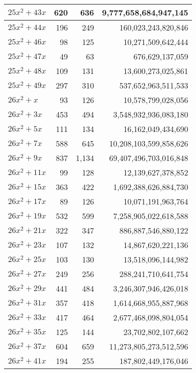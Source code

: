 \documentclass[a4paper]{amsproc}
\theoremstyle{plain}
\begin{document}
\begin{longtable}{ | l | r | r | r | }
$25x^2 + 43x$ & 620 & 636 & 9{,}777{,}658{,}684{,}947{,}145 \\ \hline
$25x^2 + 44x$ & 196 & 249 & 160{,}023{,}243{,}820{,}846 \\ \hline
$25x^2 + 46x$ & 98 & 125 & 10{,}271{,}509{,}642{,}444 \\ \hline
$25x^2 + 47x$ & 49 & 63 & 676{,}629{,}137{,}059 \\ \hline
$25x^2 + 48x$ & 109 & 131 & 13{,}600{,}273{,}025{,}861 \\ \hline
$25x^2 + 49x$ & 297 & 310 & 537{,}652{,}963{,}511{,}533 \\ \hline
$26x^2 + x$ & 93 & 126 & 10{,}578{,}799{,}028{,}056 \\ \hline
$26x^2 + 3x$ & 453 & 494 & 3{,}548{,}932{,}936{,}083{,}180 \\ \hline
$26x^2 + 5x$ & 111 & 134 & 16{,}162{,}049{,}434{,}690 \\ \hline
$26x^2 + 7x$ & 588 & 645 & 10{,}208{,}103{,}599{,}858{,}626 \\ \hline
$26x^2 + 9x$ & 837 & 1{,}134 & 69{,}407{,}496{,}703{,}016{,}848 \\ \hline
$26x^2 + 11x$ & 99 & 128 & 12{,}139{,}627{,}378{,}852 \\ \hline
$26x^2 + 15x$ & 363 & 422 & 1{,}692{,}388{,}626{,}884{,}730 \\ \hline
$26x^2 + 17x$ & 89 & 126 & 10{,}071{,}191{,}963{,}764 \\ \hline
$26x^2 + 19x$ & 532 & 599 & 7{,}258{,}905{,}022{,}618{,}588 \\ \hline
$26x^2 + 21x$ & 322 & 347 & 886{,}887{,}546{,}880{,}122 \\ \hline
$26x^2 + 23x$ & 107 & 132 & 14{,}867{,}620{,}221{,}136 \\ \hline
$26x^2 + 25x$ & 103 & 130 & 13{,}518{,}096{,}144{,}982 \\ \hline
$26x^2 + 27x$ & 249 & 256 & 288{,}241{,}710{,}641{,}754 \\ \hline
$26x^2 + 29x$ & 441 & 484 & 3{,}246{,}307{,}946{,}426{,}018 \\ \hline
$26x^2 + 31x$ & 357 & 418 & 1{,}614{,}668{,}955{,}887{,}968 \\ \hline
$26x^2 + 33x$ & 417 & 464 & 2{,}677{,}468{,}098{,}804{,}054 \\ \hline
$26x^2 + 35x$ & 125 & 144 & 23{,}702{,}802{,}107{,}662 \\ \hline
$26x^2 + 37x$ & 604 & 659 & 11{,}273{,}805{,}273{,}512{,}596 \\ \hline
$26x^2 + 41x$ & 194 & 255 & 187{,}802{,}449{,}176{,}046 \\ \hline

\end{longtable}
\end{document}
